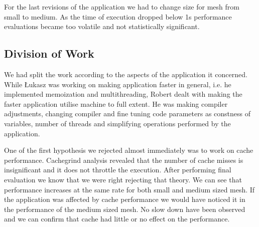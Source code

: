 \documentclass[conference]{IEEEtran}
\begin{document}
For the last revisions of the application we had to change size for mesh from small to medium. As the time of execution dropped below 1s performance evaluations became too volatile and not statistically significant.

\subsection{Division of Work}
We had split the work according to the aspects of the application it concerned. While Łukasz was working on making application faster in general, i.e. he implemented memoization and multithreading, Robert dealt with making the faster application utilise machine to full extent. He was making compiler adjustments, changing compiler and fine tuning code parameters as constness of variables, number of threads and simplifying operations performed by the application.


One of the first hypothesis we rejected almost immediately was to work on cache performance. Cachegrind analysis revealed that the number of cache misses is insignificant and it does not throttle the execution. After performing final evaluation we know that we were right rejecting that theory. We can see that performance increases at the same rate for both small and medium sized mesh. If the application was affected by cache performance we would have noticed it in the performance of the medium sized mesh. No slow down have been observed and we can confirm that cache had little or no effect on the performance.
\end{document}
